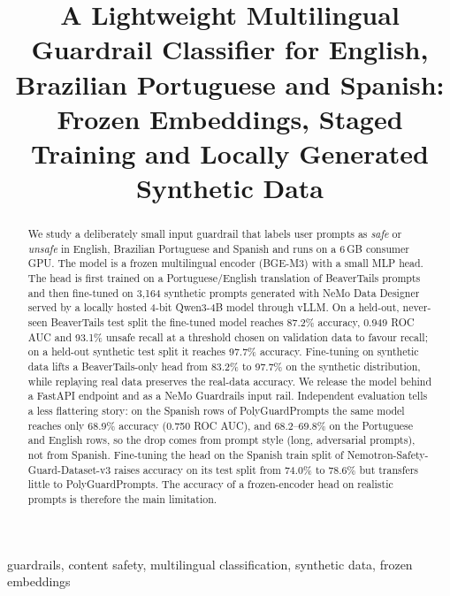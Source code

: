 \documentclass[conference]{IEEEtran}
\begin{document}
\title{A Lightweight Multilingual Guardrail Classifier for English, Brazilian Portuguese and Spanish:\\
Frozen Embeddings, Staged Training and Locally Generated Synthetic Data}

\author{
}

\maketitle

\begin{abstract}
We study a deliberately small input guardrail that labels user prompts as \emph{safe} or \emph{unsafe} in English, Brazilian Portuguese and Spanish and runs on a 6\,GB consumer GPU. The model is a frozen multilingual encoder (BGE-M3) with a small MLP head. The head is first trained on a Portuguese/English translation of BeaverTails prompts and then fine-tuned on 3{,}164 synthetic prompts generated with NeMo Data Designer served by a locally hosted 4-bit Qwen3-4B model through vLLM. On a held-out, never-seen BeaverTails test split the fine-tuned model reaches 87.2\% accuracy, 0.949 ROC AUC and 93.1\% unsafe recall at a threshold chosen on validation data to favour recall; on a held-out synthetic test split it reaches 97.7\% accuracy. Fine-tuning on synthetic data lifts a BeaverTails-only head from 83.2\% to 97.7\% on the synthetic distribution, while replaying real data preserves the real-data accuracy. We release the model behind a FastAPI endpoint and as a NeMo Guardrails input rail. Independent evaluation tells a less flattering story: on the Spanish rows of PolyGuardPrompts the same model reaches only 68.9\% accuracy (0.750 ROC AUC), and 68.2--69.8\% on the Portuguese and English rows, so the drop comes from prompt style (long, adversarial prompts), not from Spanish. Fine-tuning the head on the Spanish train split of Nemotron-Safety-Guard-Dataset-v3 raises accuracy on its test split from 74.0\% to 78.6\% but transfers little to PolyGuardPrompts. The accuracy of a frozen-encoder head on realistic prompts is therefore the main limitation.
\end{abstract}

\begin{IEEEkeywords}
guardrails, content safety, multilingual classification, synthetic data, frozen embeddings
\end{IEEEkeywords}
\end{document}
